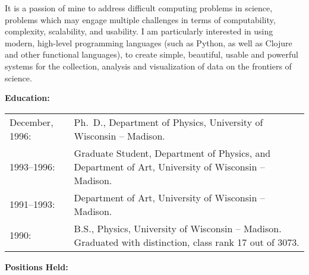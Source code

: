 It is a passion of mine to address difficult computing problems in science, problems which may engage multiple challenges in terms of computability, complexity, scalability, and usability.  I am particularly interested in using modern, high-level programming languages (such as Python, as well as Clojure and other functional languages), to create simple, beautiful, usable and powerful systems for the collection, analysis and visualization of data on the frontiers of science.

\vspace{0.5cm}

{\bf Education:}
\vspace{0.25cm}

\begin{tabular}[t]{lp{}}

December, 1996: & Ph.~D., Department of Physics,
University of Wisconsin -- Madison.
\\[0.25cm]

1993--1996: & Graduate Student, Department of Physics, and Department of Art,
University of Wisconsin -- Madison.\\[0.25cm]

1991--1993: & Department of Art, University of Wisconsin -- Madison.
\\[0.25cm]

1990: & B.S., Physics, University of Wisconsin -- Madison.  Graduated
with distinction, class rank 17 out of 3073.

\end{tabular}

\newpage
\pagestyle{myheadings}

{\bf Positions Held:}
\vspace{0.25cm}

